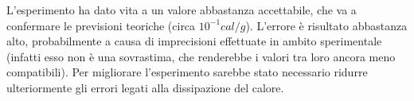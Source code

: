 L'esperimento ha dato vita a un valore abbastanza accettabile, che va a confermare le previsioni teoriche (circa $10^{-1}
 cal/g$). L'errore è risultato abbastanza alto, probabilmente a causa di imprecisioni effettuate in ambito sperimentale
 (infatti esso non è una sovrastima, che renderebbe i valori tra loro ancora meno compatibili). Per migliorare
 l'esperimento sarebbe stato necessario ridurre ulteriormente gli errori legati alla dissipazione del calore. 
